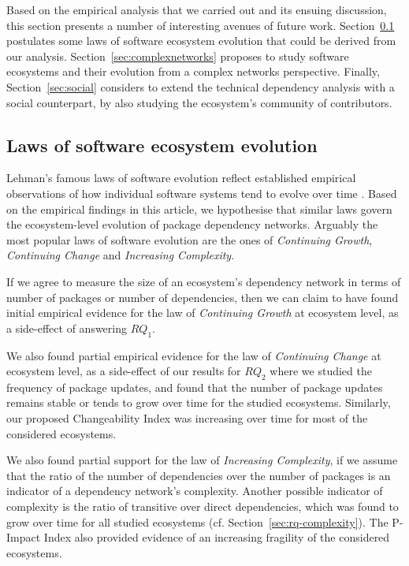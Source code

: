 \documentclass[smallextended]{svjour3}       %
\newcommand{\sect}[1]{Section~\ref{#1}}
\begin{document}
Based on the empirical analysis that we carried out and its ensuing discussion, 
this section presents a number of interesting avenues of future work.
\sect{sec:laws} postulates some laws of software ecosystem evolution that could be derived from our analysis.
\sect{sec:complexnetworks} proposes to study software ecosystems and their evolution from a complex networks perspective.
Finally, \sect{sec:social} considers to extend the technical dependency analysis with a social counterpart, by also studying the ecosystem's community of contributors.

\subsection{Laws of software ecosystem evolution}
\label{sec:laws}

Lehman's famous laws of software evolution reflect established empirical observations of how individual software systems tend to evolve over time \cite{Lehman&al1997}. Based on the empirical findings in this article, we hypothesise that similar laws govern the ecosystem-level evolution of package dependency networks. Arguably the most popular laws of software evolution are the ones of \emph{Continuing Growth}, \emph{Continuing Change} and \emph{Increasing Complexity}.

If we agree to measure the size of an ecosystem's dependency network in terms of number of packages or number of dependencies, then we can claim to have found initial empirical evidence for the law of \emph{Continuing Growth} at ecosystem level, as a side-effect of answering $RQ_1$. 

We also found partial empirical evidence for the law of \emph{Continuing Change} at ecosystem level, as a side-effect of our results for $RQ_2$ where we studied the frequency of package updates, and found that the number of package updates remains stable or tends to grow over time for the studied ecosystems.
Similarly, our proposed Changeability Index was increasing over time for most of the considered ecosystems.

We also found partial support for the  law of \emph{Increasing Complexity}, if we assume that the ratio of the number of dependencies over the number of packages is an indicator of a dependency network's complexity. Another possible indicator of complexity is 
the ratio of transitive over direct dependencies, which was found to grow over time for all studied ecosystems (cf. \sect{sec:rq-complexity}). The P-Impact Index also provided evidence of an increasing fragility of the considered ecosystems.
\end{document}
